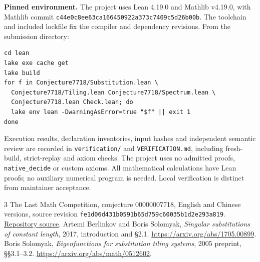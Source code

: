 \documentclass[11pt,a4paper]{article}
\newcommand{\code}[1]{\nolinkurl{#1}}
\begin{document}
\textbf{Pinned environment.}
The project uses Lean 4.19.0 and Mathlib v4.19.0, with Mathlib commit
\code{c44e0c8ee63ca166450922a373c7409c5d26b00b}. The toolchain and included lockfile fix the compiler and dependency revisions. From the submission directory:
\begin{Verbatim}[fontsize=\small]
cd lean
lake exe cache get
lake build
for f in Conjecture7718/Substitution.lean \
  Conjecture7718/Tiling.lean Conjecture7718/Spectrum.lean \
  Conjecture7718.lean Check.lean; do
  lake env lean -DwarningAsError=true "$f" || exit 1
done
\end{Verbatim}
Execution results, declaration inventories, input hashes and independent semantic review are recorded in \code{verification/} and \code{VERIFICATION.md}, including fresh-build, strict-replay and axiom checks. The project uses no admitted proofs, \code{native_decide} or custom axioms. All mathematical calculations have Lean proofs; no auxiliary numerical program is needed. Local verification is distinct from maintainer acceptance.

\begin{thebibliography}{3}\small
{} The Last Math Competition, conjecture 00000007718, English and Chinese versions, source revision \code{fe1d06d431b0591b65d759c60035b1d2e293a819}. \href{https://github.com/The-Last-Math-Competition/The-Last-Math-Competition/blob/fe1d06d431b0591b65d759c60035b1d2e293a819/conjectures/00000007718.md}{Repository source}.
\bibitem{berlinkov} Artemi Berlinkov and Boris Solomyak, \emph{Singular substitutions of constant length}, 2017, introduction and \S2.1. \url{https://arxiv.org/abs/1705.00899}.
\bibitem{solomyak} Boris Solomyak, \emph{Eigenfunctions for substitution tiling systems}, 2005 preprint, \S\S3.1--3.2. \url{https://arxiv.org/abs/math/0512602}.
\end{thebibliography}
\end{document}
